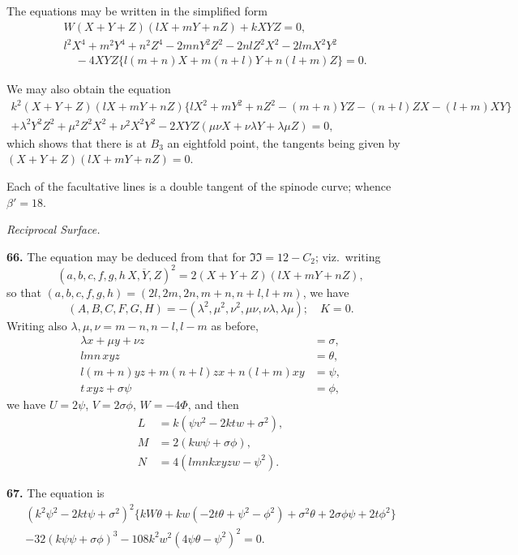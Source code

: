\documentclass[11pt,a4paper]{article}
\theoremstyle{definition}
\begin{document}
The equations may be written in the simplified form
\begin{align*}
&W(X + Y + Z)(lX + mY + nZ) + kXYZ = 0, \\
&l^2X^4 + m^2Y^4 + n^2Z^4 - 2mnY^2Z^2 - 2nlZ^2X^2 - 2lmX^2Y^2 \\
&\quad - 4XYZ\{l(m + n)X + m(n + l)Y + n(l + m)Z\} = 0.
\end{align*}

We may also obtain the equation
\begin{multline*}
k^2(X + Y + Z)(lX + mY + nZ)\{lX^2 + mY^2 + nZ^2 - (m + n)YZ - (n + l)ZX - (l + m)XY\} \\
+ \lambda^2Y^2Z^2 + \mu^2Z^2X^2 + \nu^2X^2Y^2 - 2XYZ(\mu\nu X + \nu\lambda Y + \lambda\mu Z) = 0,
\end{multline*}
which shows that there is at $B_3$ an eightfold point, the tangents being given by $(X + Y + Z)(lX + mY + nZ) = 0$.

Each of the facultative lines is a double tangent of the spinode curve; whence $\beta' = 18$.

\textit{Reciprocal Surface.}

\textbf{66.} The equation may be deduced from that for $\mathfrak{II} = 12 - C_2$; viz.\ writing
\[
(a, b, c, f, g, h \,\overline{\!\!X, Y, Z\!\!})^2 = 2(X + Y + Z)(lX + mY + nZ),
\]
so that $(a, b, c, f, g, h) = (2l, 2m, 2n, m + n, n + l, l + m)$, we have
\[
(A, B, C, F, G, H) = -(\lambda^2, \mu^2, \nu^2, \mu\nu, \nu\lambda, \lambda\mu); \quad K = 0.
\]
Writing also $\lambda, \mu, \nu = m - n, n - l, l - m$ as before,
\begin{align*}
\lambda x + \mu y + \nu z &= \sigma, \\
lmn\,xyz &= \theta, \\
l(m + n)yz + m(n + l)zx + n(l + m)xy &= \psi, \\
t\,xyz + \sigma\psi &= \phi,
\end{align*}
we have $U = 2\psi$, $V = 2\sigma\phi$, $W = -4\Phi$, and then
\begin{align*}
L &= k(\psi v^2 - 2ktw + \sigma^2), \\
M &= 2(kw\psi + \sigma\phi), \\
N &= 4(lmnkxyzw - \psi^2).
\end{align*}

\textbf{67.} The equation is
\begin{multline*}
(k^2\psi^2 - 2kt\psi + \sigma^2)^2\{kW\theta + kw(-2t\theta + \psi^2 - \phi^2) + \sigma^2\theta + 2\sigma\phi\psi + 2t\phi^2\} \\
- 32(k\psi\psi + \sigma\phi)^3 - 108k^2w^2(4\psi\theta - \psi^2)^2 = 0.
\end{multline*}
\end{document}
